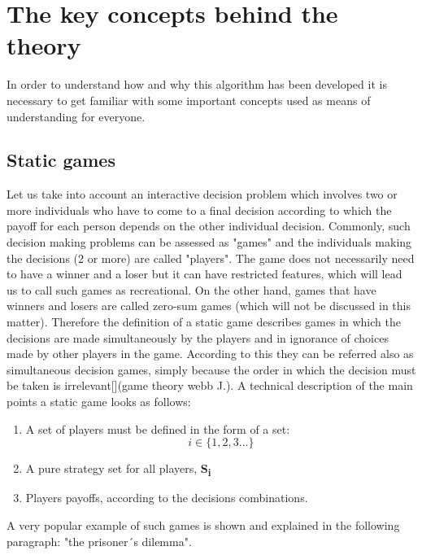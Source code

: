 \documentclass[conference]{IEEEtran}
\begin{document}
\section{The key concepts behind the theory}
In order to understand how and why this algorithm has been developed it is necessary to get familiar with some important concepts used as means of understanding for everyone.
\subsection{Static games}
Let us take into account an interactive decision problem which involves two or more individuals who have to come to a final decision according to which the payoff for each person depends on the other individual decision. Commonly, such decision making problems can be assessed as "games" and the individuals making the decisions (2 or more) are called "players". The game does not necessarily need to have a winner and a loser but it can have restricted features, which will lead us to call such games as recreational. On the other hand, games
that have winners and losers are called zero-sum games (which will not be discussed in this matter). 
Therefore the definition of a static game describes games in which the decisions are made simultaneously by the players and in ignorance of choices made by other players in the game. According to this they can be referred also as simultaneous decision games, simply because the order in which the decision must be taken is irrelevant[](game theory webb J.). A technical description of the main points a static game looks as follows:
\begin{enumerate}
  \item A set of players must be defined in the form of a set: \[i\in       \{1,2,3...\}\]
  \item A pure strategy set for all players, \textbf{S{\textsubscript{i}}}
  \item Players payoffs, according to the decisions combinations.
\end{enumerate} 
A very popular example of such games is shown and explained in the following paragraph: "the prisoner´s dilemma".
\end{document}
